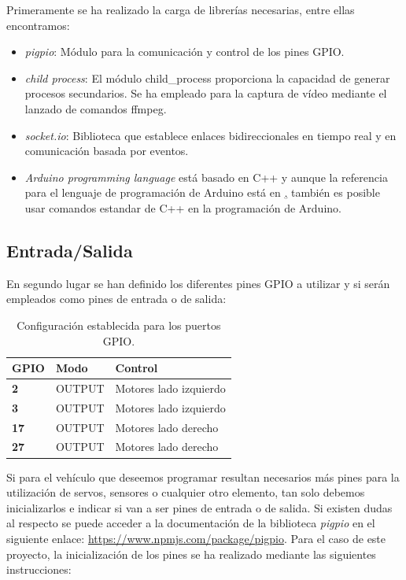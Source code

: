 Primeramente se ha realizado la carga de librerías necesarias, entre ellas encontramos:

\begin{itemize}
 \item \emph{pigpio}: Módulo para la comunicación y control de los pines GPIO.
 \item \emph{child process}: El módulo child\_process proporciona la capacidad de generar procesos secundarios. Se ha empleado para la captura de vídeo mediante el lanzado de comandos ffmpeg.
 \item \emph{socket.io}: Biblioteca que establece enlaces bidireccionales en tiempo real y en comunicación basada por eventos.
 \item \emph{Arduino programming language}  está basado en C++ y aunque la referencia para el lenguaje de programación de Arduino está en \href{http://arduino.cc/en/Reference/HomePage}, también es posible usar comandos estandar de C++ en la programación de Arduino.
\end{itemize}


\subsection{Entrada/Salida}

En segundo lugar se han definido los diferentes pines GPIO a utilizar y si serán empleados como pines de entrada o de salida:

\begin{table}[H]
  \begin{center}
    \begin{tabular}{|p{2.5cm}|p{2.5cm}|p{4.5cm}|}
      \hline
      {\textbf{GPIO}} & \textbf{ Modo } & \textbf{ Control }\\
      \hline
      {\textbf{ 2 }} & { OUTPUT } & { Motores lado izquierdo }  \\
     \hline
      {\textbf{ 3 }} & { OUTPUT } & { Motores lado izquierdo } \\
      \hline
      {\textbf{ 17 }} & { OUTPUT } & {  Motores lado derecho } \\
      \hline
      {\textbf{ 27 }} & { OUTPUT } & { Motores lado derecho } \\
     \hline   
    \end{tabular}
  \end{center}
\caption{ Configuración establecida para los puertos GPIO. }
\end{table}


Si para el vehículo que deseemos programar resultan necesarios más pines para la utilización de servos, sensores o cualquier otro elemento, tan solo debemos inicializarlos e indicar si van a ser pines de entrada
o de salida. Si existen dudas al respecto se puede acceder a la documentación de la biblioteca \emph{pigpio} en el siguiente enlace: \url{https://www.npmjs.com/package/pigpio}.
Para el caso de este proyecto, la inicialización de los pines se ha realizado mediante las siguientes instrucciones:


